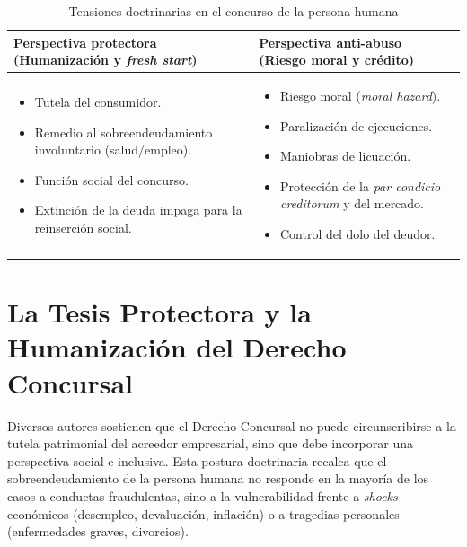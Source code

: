\documentclass[12pt,oneside]{book}
\begin{document}
\begin{table}[H]
\centering
\caption{Tensiones doctrinarias en el concurso de la persona humana}
\renewcommand{\arraystretch}{1.2}
\begin{tabularx}{\textwidth}{
    >{\raggedright\arraybackslash}X
    >{\raggedright\arraybackslash}X
}
\toprule
\textbf{Perspectiva protectora} \newline (Humanización y \textit{fresh start}) &
\textbf{Perspectiva anti-abuso} \newline (Riesgo moral y crédito) \\
\midrule
\begin{itemize}[leftmargin=*,nosep]
    \item Tutela del consumidor.
    \item Remedio al sobreendeudamiento involuntario (salud/empleo).
    \item Función social del concurso.
    \item Extinción de la deuda impaga para la reinserción social.
\end{itemize}
&
\begin{itemize}[leftmargin=*,nosep]
    \item Riesgo moral (\textit{moral hazard}).
    \item Paralización de ejecuciones.
    \item Maniobras de licuación.
    \item Protección de la \textit{par condicio creditorum} y del mercado.
    \item Control del dolo del deudor.
\end{itemize}
\\
\bottomrule
\end{tabularx}
\end{table}

\section{La Tesis Protectora y la Humanización del Derecho Concursal}

Diversos autores sostienen que el Derecho Concursal no puede circunscribirse a la tutela patrimonial del acreedor empresarial, sino que debe incorporar una perspectiva social e inclusiva. Esta postura doctrinaria recalca que el sobreendeudamiento de la persona humana no responde en la mayoría de los casos a conductas fraudulentas, sino a la vulnerabilidad frente a \textit{shocks} económicos (desempleo, devaluación, inflación) o a tragedias personales (enfermedades graves, divorcios).
\end{document}
